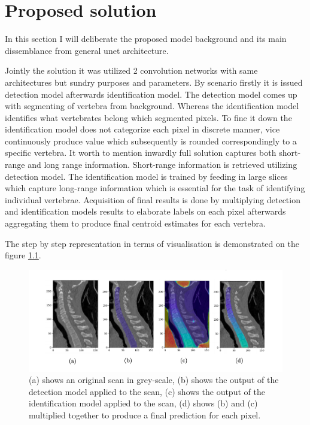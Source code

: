 \chapter{Proposed solution}
\label{ch:proposed_solution}

In this section I will deliberate the proposed model background and its main dissemblance from general unet architecture.

Jointly the solution it was utilized 2 convolution networks with same architectures but sundry purposes and parameters. By scenario firstly it is issued detection model afterwards identification model. The detection model comes up with segmenting of vertebra from background. Whereas the identification model identifies what vertebrates belong which segmented pixels. To fine it down the identification model does not categorize each pixel in discrete manner, vice continuously produce value which subsequently is rounded correspondingly to a specific vertebra. It worth to mention inwardly full solution captures both short-range and long range information. Short-range information is retrieved utilizing detection model. The identification model is trained by feeding in large slices which capture long-range information which is essential for the task of identifying individual vertebrae. Acquisition of final results is done by multiplying detection and identification models results to elaborate labels on each pixel afterwards aggregating them to produce final centroid estimates for each vertebra.

The step by step representation in terms of visualisation is demonstrated on the figure \ref{fig:detection_identification_steps}.

\begin{figure}[h]
    \centering \includegraphics[width=12cm]{images/detection_identification_steps.png}
    \caption {(a) shows an original scan in grey-scale, (b) shows the output of the detection model applied to the scan, (c) shows the output of the identification model applied to the scan, (d) shows (b) and (c) multiplied together to produce a final prediction for each pixel.}
    \label{fig:detection_identification_steps}
\end{figure}

